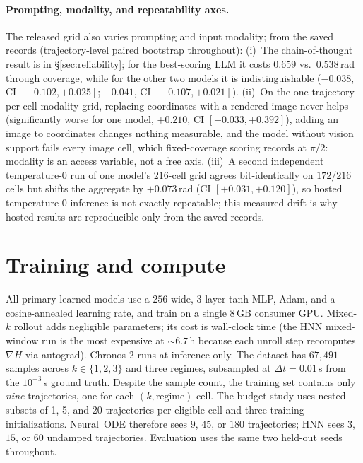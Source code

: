 \documentclass{article}
\begin{document}
\paragraph{Prompting, modality, and repeatability axes.}
\label{app:axes}
The released grid also varies prompting and input modality; from the saved records
(trajectory-level paired bootstrap throughout): (i)~The chain-of-thought result is in
\S\ref{sec:reliability}; for the best-scoring LLM it costs $0.659$ vs.\ $0.538$\,rad through
coverage, while for the other two models it is indistinguishable ($-0.038$, CI
$[-0.102,+0.025]$; $-0.041$, CI $[-0.107,+0.021]$). (ii)~On the one-trajectory-per-cell
modality grid, replacing
coordinates with a rendered image never helps (significantly worse for one model, $+0.210$,
CI $[+0.033,+0.392]$), adding an image to coordinates changes nothing measurable, and the
model without vision support fails every image cell, which fixed-coverage scoring records
at $\pi/2$: modality is an access variable, not a free axis. (iii)~A second independent
temperature-$0$ run of one model's $216$-cell grid agrees bit-identically on $172/216$
cells but shifts the aggregate by $+0.073$\,rad (CI $[+0.031,+0.120]$), so hosted
temperature-$0$ inference is not exactly repeatable; this measured drift is why hosted
results are reproducible only from the saved records.

\section{Training and compute}
All primary learned models use a $256$-wide, $3$-layer tanh MLP, Adam, and a cosine-annealed
learning rate, and train on a single 8\,GB consumer GPU. Mixed-$k$ rollout adds negligible parameters;
its cost is wall-clock time (the HNN mixed-window run is the most expensive at ${\sim}6.7$\,h because
each unroll step recomputes $\nabla H$ via autograd). Chronos-2 runs at inference only. The
dataset has $67{,}491$ samples across $k\in\{1,2,3\}$ and three regimes, subsampled at
$\Delta t{=}0.01$\,s from the $10^{-3}$\,s ground truth. Despite the sample count, the
training set contains only \emph{nine} trajectories, one for each $(k,\mathrm{regime})$ cell. The
budget study uses nested subsets of 1, 5, and 20 trajectories per eligible cell and three
training initializations. Neural~ODE therefore sees $9$, $45$, or $180$ trajectories; HNN sees $3$,
$15$, or $60$ undamped trajectories. Evaluation uses the same two held-out seeds throughout.
\end{document}
